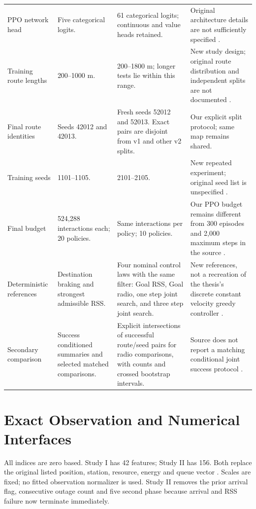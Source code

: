 {\begin{longtable}{@{}p{}p{}p{}p{}@{}}
PPO network head & Five categorical logits. & 61 categorical logits; continuous and value heads retained. & Original architecture details are not sufficiently specified \cite[p. 13, Sec. 5.3]{thesis}.\\
Training route lengths & 200--1000 m. & 200--1800 m; longer tests lie within this range. & New study design; original route distribution and independent splits are not documented \cite[pp. 15--16, Secs. 6.2--6.3]{thesis}.\\
Final route identities & Seeds 42012 and 42013. & Fresh seeds 52012 and 52013. Exact pairs are disjoint from v1 and other v2 splits. & Our explicit split protocol; same map remains shared.\\
Training seeds & 1101--1105. & 2101--2105. & New repeated experiment; original seed list is unspecified \cite[pp. 15--16]{thesis}.\\
Final budget & 524,288 interactions each; 20 policies. & Same interactions per policy; 10 policies. & Our PPO budget remains different from 300 episodes and 2,000 maximum steps in the source \cite[p. 16, Table 4]{thesis}.\\
Deterministic references & Destination braking and strongest admissible RSS. & Four nominal control laws with the same filter: Goal RSS, Goal radio, one step joint search, and three step joint search. & New references, not a recreation of the thesis's discrete constant velocity greedy controller \cite[pp. 13--14, Sec. 5.4]{thesis}.\\
Secondary comparison & Success conditioned summaries and selected matched comparisons. & Explicit intersections of successful route/seed pairs for radio comparisons, with counts and crossed bootstrap intervals. & Source does not report a matching conditional joint success protocol \cite[pp. 16--20, Sec. 7]{thesis}.\\
\end{longtable}}
\clearpage
\section{Exact Observation and Numerical Interfaces}
\label{app:observations}
All indices are zero based. Study I has 42 features; Study II has 156. Both
replace the original listed position, station, resource, energy and queue vector
\cite[p.~12, Sec.~5.2]{thesis}. Scales are fixed; no fitted observation normalizer
is used. Study II removes the prior arrival flag, consecutive outage count and
five second phase because arrival and RSS failure now terminate immediately.

